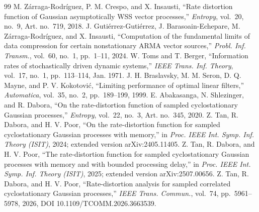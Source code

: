 \documentclass[11pt,onecolumn]{IEEEtran}
\begin{document}
\begin{thebibliography}{99}
M. Z\'arraga-Rodr\'iguez, P. M. Crespo, and X. Insausti, ``Rate
distortion function of Gaussian asymptotically WSS vector processes,''
\emph{Entropy}, vol.~20, no.~9, Art. no.~719, 2018.
 J. Guti\'errez-Guti\'errez,
J. Barasoain-Echepare, M. Z\'arraga-Rodr\'iguez, and X. Insausti,
``Computation of the fundamental limits of data compression for certain
nonstationary ARMA vector sources,'' \emph{Probl. Inf. Transm.},
vol.~60, no.~1, pp.~1--11, 2024.
 W. Toms and T. Berger, ``Information rates of
stochastically driven dynamic systems,'' \emph{IEEE Trans. Inf.
Theory}, vol.~17, no.~1, pp.~113--114, Jan. 1971.
 J. H. Braslavsky, M. M. Seron, D. Q. Mayne,
and P. V. Kokotovi\'c, ``Limiting performance of optimal linear
filters,'' \emph{Automatica}, vol.~35, no.~2, pp.~189--199, 1999.
 E. Abakasanga, N. Shlezinger, and R. Dabora,
``On the rate-distortion function of sampled cyclostationary Gaussian
processes,'' \emph{Entropy}, vol.~22, no.~3, Art. no.~345, 2020.
 Z. Tan, R. Dabora, and H. V. Poor, ``On the
rate-distortion function for sampled cyclostationary Gaussian processes
with memory,'' in \emph{Proc. IEEE Int. Symp. Inf. Theory (ISIT)}, 2024;
extended version arXiv:2405.11405.
 Z. Tan, R. Dabora, and H. V. Poor, ``The rate-distortion
function for sampled cyclostationary Gaussian processes with memory and
with bounded processing delay,'' in \emph{Proc. IEEE Int. Symp. Inf.
Theory (ISIT)}, 2025; extended version arXiv:2507.00656.
 Z. Tan, R. Dabora, and H. V. Poor, ``Rate-distortion
analysis for sampled correlated cyclostationary Gaussian processes,''
\emph{IEEE Trans. Commun.}, vol.~74, pp.~5961--5978, 2026, DOI
10.1109/TCOMM.2026.3663539.

\end{thebibliography}
\end{document}
